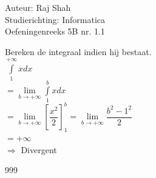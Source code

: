 \documentclass[a4paper]{article}
\begin{document}
  
\noindent \large Auteur: Raj Shah \\
\noindent \large Studierichting: Informatica\\
\noindent \large Oefeningenreeks 5B nr. 1.1\\

\medskip

\normalsize

Bereken de integraal indien hij bestaat. \\

$\displaystyle\int \limits_{1}^{+\infty} x dx$ \\

$ = \lim\limits_{b \to +\infty} \displaystyle \int \limits_{1}^{b} x dx$\\

$ = \lim\limits_{b \to +\infty} \left[\dfrac{x^2}{2}\right]_{1}^{b} = \lim\limits_{b \to +\infty} \dfrac{b^2 - 1^2}{2}$ \\

$ = + \infty $ \\

$\Rightarrow$ Divergent 







\begin{thebibliography}{999}
\end{thebibliography}
\end{document}
